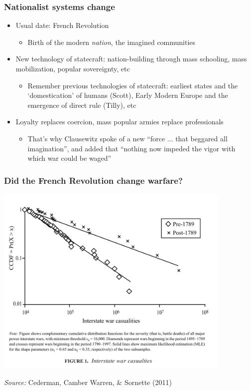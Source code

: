 \documentclass[aspectratio=43]{beamer}
\begin{document}
\begin{frame}
\frametitle{Nationalist systems change}
\centering

\begin{itemize}
  \item Usual date: French Revolution
  \begin{itemize}
    \item Birth of the modern \textit{nation}, the imagined communities
  \end{itemize}
  \item New technology of statecraft: nation-building through mass schooling, mass mobilization, popular sovereignty, etc
  \begin{itemize}
    \item Remember previous technologies of statecraft: earliest states and the `domestication' of humans (Scott), Early Modern Europe and the emergence of direct rule (Tilly), etc
  \end{itemize}
  \item Loyalty replaces coercion, mass popular armies replace professionals
  \begin{itemize}
    \item That's why Clausewitz spoke of a new ``force ... that beggared all imagination'', and added that ``nothing now impeded the vigor with which war could be waged''
  \end{itemize}
\end{itemize}

\end{frame}

\begin{frame}
\frametitle{Did the French Revolution change warfare?}
\centering

\includegraphics[width = 0.85\textwidth]{img/cederman_et_al_fig1}

{\scriptsize \textit{Source:} Cederman, Camber Warren, \& Sornette (2011)}

\end{frame}
\end{document}
